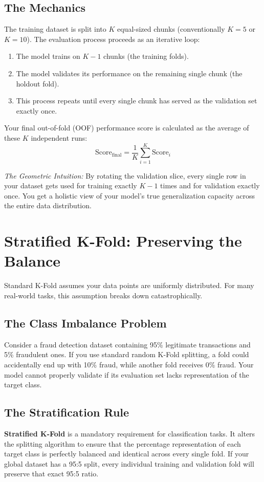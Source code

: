 \documentclass{article}
\begin{document}
\subsection{The Mechanics}
The training dataset is split into $K$ equal-sized chunks (conventionally $K=5$ or $K=10$). The evaluation process proceeds as an iterative loop:
\begin{enumerate}
    \item The model trains on $K-1$ chunks (the training folds).
    \item The model validates its performance on the remaining single chunk (the holdout fold).
    \item This process repeats until every single chunk has served as the validation set exactly once.
\end{enumerate}

Your final out-of-fold (OOF) performance score is calculated as the average of these $K$ independent runs:
\begin{equation}
    \text{Score}_{\text{final}} = \frac{1}{K} \sum_{i=1}^{K} \text{Score}_i
\end{equation}

\textit{The Geometric Intuition:} By rotating the validation slice, every single row in your dataset gets used for training exactly $K-1$ times and for validation exactly once. You get a holistic view of your model's true generalization capacity across the entire data distribution.

\section{Stratified K-Fold: Preserving the Balance}
Standard K-Fold assumes your data points are uniformly distributed. For many real-world tasks, this assumption breaks down catastrophically.

\subsection{The Class Imbalance Problem}
Consider a fraud detection dataset containing 95\% legitimate transactions and 5\% fraudulent ones. If you use standard random K-Fold splitting, a fold could accidentally end up with 10\% fraud, while another fold receives 0\% fraud. Your model cannot properly validate if its evaluation set lacks representation of the target class.

\subsection{The Stratification Rule}
\textbf{Stratified K-Fold} is a mandatory requirement for classification tasks. It alters the splitting algorithm to ensure that the percentage representation of each target class is perfectly balanced and identical across every single fold. If your global dataset has a 95:5 split, every individual training and validation fold will preserve that exact 95:5 ratio.
\end{document}
